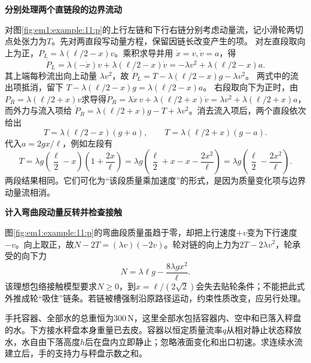 \begin{solution}
\par\medskip{}\noindent\textbf{分别处理两个直链段的边界流动}\par\nobreak
对图\ref{fig:em1:example:11:p}的上行左链和下行右链分别考虑动量流，记小滑轮两切点处张力为$T$。先对两直段写动量方程，保留因链长改变产生的项。
对左直段取向上为正，$P_L=\lambda(\ell/2-x)v$。乘积求导并用 $\dot x=v,\dot v=a$，得
\[
\dot P_L=\lambda(-\dot x)v+\lambda(\ell/2-x)\dot v
=-\lambda v^2+\lambda(\ell/2-x)a.
\]
其上端每秒流出向上动量 $\lambda v^2$，故
$\dot P_L=T-\lambda(\ell/2-x)g-\lambda v^2$。
两式中的流出项抵消，留下 $T-\lambda(\ell/2-x)g=\lambda(\ell/2-x)a$。
右段取向下为正时，由$P_R=\lambda(\ell/2+x)v$求导得$\dot P_R=\lambda\dot x\,v+\lambda(\ell/2+x)\dot v=\lambda v^2+\lambda(\ell/2+x)a$，而外力与流入项给
$\dot P_R=\lambda(\ell/2+x)g-T+\lambda v^2$。消去流入项后，两个直段依次给出
\[
T=\lambda(\ell/2-x)(g+a),\qquad
T=\lambda(\ell/2+x)(g-a).
\]
代入$a=2gx/\ell$，例如左段有
\[
T=\lambda g\left(\frac\ell2-x\right)\left(1+\frac{2x}{\ell}\right)
=\lambda g\left(\frac\ell2+x-x-\frac{2x^2}{\ell}\right)
=\lambda g\left(\frac\ell2-\frac{2x^2}{\ell}\right).
\]
两段结果相同。它们可化为“该段质量乘加速度”的形式，是因为质量变化项与边界动量流相消。



\par\medskip{}\noindent\textbf{计入弯曲段动量反转并检查接触}\par\nobreak
图\ref{fig:em1:example:11:p}的弯曲段质量虽趋于零，却把上行速度$+v$变为下行速度$-v$。向上取正，故$N-2T=(\lambda v)(-2v)$。轮对链的向上力为$2T-2\lambda v^2$，轮承受的向下力
\[\boxed{N=\lambda\ell g-\frac{8\lambda gx^2}{\ell}}.\]
该理想包络接触模型要求$N\ge0$，到$x=\ell/(2\sqrt2)$会失去贴轮条件；不能把此式外推成轮“吸住”链条。若链被槽强制沿原路径运动，约束性质改变，应另行处理。\end{solution}
\begin{question}\begin{example}[漏水容器与秤盘的总示数]\label{em1:example:12}
手托容器、全部水的总重恒为$300\,\mathrm N$，这里全部水包括容器内、空中和已落入秤盘的水。下方接水秤盘本身重量已去皮。容器以恒定质量流率$q$从相对静止状态释放水，水自由下落高度$h$后在盘内立即静止；忽略液面变化和出口初速。求连续水流建立后，手的支持力与秤盘示数之和。
\end{example}
\end{question}
